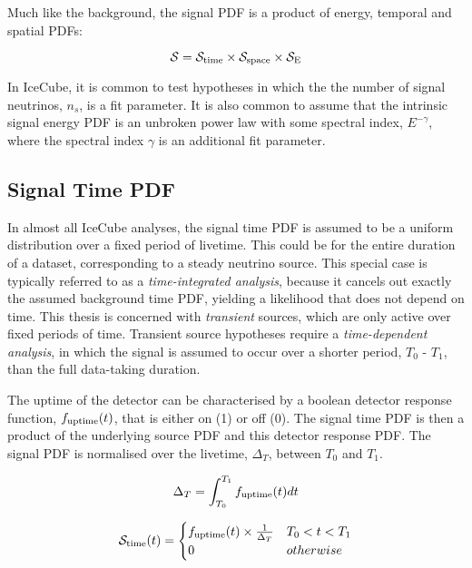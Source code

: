 Much like the background, the signal PDF is a product of energy, temporal and spatial PDFs:

\begin{equation}
\mathcal{S} =  \mathcal{S}_{\textup{time}} \times  \mathcal{S}_{\textup{space}} \times\mathcal{S}_{\textup{E}}
\end{equation}

In IceCube, it is common to test hypotheses in which the the number of signal neutrinos, $n_{s}$, is a fit parameter. It is also common to assume that the intrinsic signal energy PDF is an unbroken power law with some spectral index, $E^{-\gamma}$, where the spectral index $\gamma$ is an additional fit parameter. 

\subsection{Signal Time PDF}

In almost all IceCube analyses, the signal time PDF is assumed to be a uniform distribution over a fixed period of livetime. This could be for the entire duration of a dataset, corresponding to a steady neutrino source. This special case is typically referred to as a \emph{time-integrated analysis}, because it cancels out exactly the assumed background time PDF, yielding a likelihood that does not depend on time. This thesis is concerned with \emph{transient} sources, which are only active over fixed periods of time.  Transient source hypotheses require a \emph{time-dependent analysis}, in which the signal is assumed to occur over a shorter period, $T_{0}$ - $T_{1}$, than the full data-taking duration.

The uptime of the detector can be characterised by a boolean detector response function, $f_{\textup{uptime}}(t)$, that is either on (1) or off (0). The signal time PDF is then a product of the underlying source PDF and this detector response PDF. The signal PDF is normalised over the livetime, $\Delta_{T}$, between $T_{0}$ and $T_{1}$.

\begin{equation}
\Delta_{T} = \int_{T_{0}}^{T_{1}}f_{\textup{uptime}}(t) dt
\end{equation}

\begin{equation}
\mathcal{S}_{\textup{time}} (t)= 
\begin{cases}
	f_{\textup{uptime}}(t) \times \frac{1}{\Delta_{T}} & T_{0} < t < T_{1}\\
	0 & otherwise\\
\end{cases}
\end{equation}

